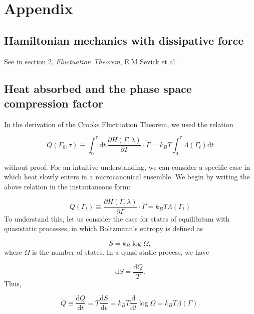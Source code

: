 \documentclass[ reprint, amsmath,amssymb, aps,]{revtex4-1}
\begin{document}
\section{Appendix}

\subsection{Hamiltonian mechanics with dissipative force}


See in section 2, \textit{Fluctuation Theorem}, E.M Sevick et al.\cite{Sevick2007}.


\subsection{Heat absorbed and the phase space compression factor}

In the derivation of the Crooks Fluctuation Theorem, we used the relation

\begin{equation}
  Q(\Gamma_0,\tau)\equiv\int_0^\tau\mathrm{d}t\  \frac{\partial H(\Gamma,\lambda)}{\partial{\Gamma}}\cdot\dot{\Gamma}=k_BT\int_0^\tau
\Lambda(\Gamma_t) \mathrm{d}t
\end{equation}

without proof. For an intuitive understanding, we can consider a specific case in which heat slowly enters in a microcanonical ensemble. We begin by writing the above relation in the instantaneous form:

\begin{equation}
\dot{Q}(\Gamma_t)\equiv\frac{\partial H(\Gamma,\lambda)}{\partial \Gamma}\cdot\dot\Gamma = k_BT\Lambda(\Gamma_t)
\end{equation}
To understand this, let us consider the case for states of equilibrium with quasistatic processes, in which Boltzmann's entropy is defined as 

\begin{equation}
S=k_B\log \Omega,
\end{equation}
where $\Omega$ is the number of states. In a quasi-static process, we have 

\begin{equation}
\mathrm{d}S=\frac{\mathrm{d}Q}{T}.
\end{equation}
Thus,

\begin{equation}
\dot{Q}\equiv\frac{\mathrm{d}Q}{\mathrm{d}t}=T\frac{\mathrm{d}S}{\mathrm{d}t}=k_BT\frac{\mathrm{d}}{\mathrm{d}t}\log{\Omega}=k_BT\Lambda(\Gamma).
\end{equation}

\nocite{*}
 


\end{document}
